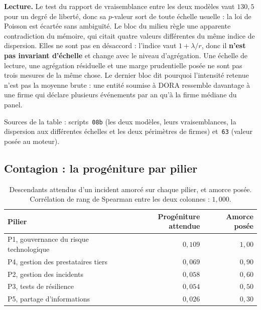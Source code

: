 \documentclass[12pt,a4paper]{article}
\theoremstyle{definition}
\begin{document}
\textbf{Lecture.} Le test du rapport de vraisemblance entre les deux modèles vaut
$130{,}5$ pour un degré de liberté, donc sa $p$-valeur sort de toute échelle
usuelle : la loi de Poisson est écartée sans ambiguïté. Le bloc du milieu règle une
apparente contradiction du mémoire, qui citait quatre valeurs différentes du même
indice de dispersion. Elles ne sont pas en désaccord : l'indice vaut
$1 + \lambda/r$, donc il \textbf{n'est pas invariant d'échelle} et change avec le
niveau d'agrégation. Une échelle de lecture, une agrégation résiduelle et une marge
prudentielle posée ne sont pas trois mesures de la même chose. Le dernier bloc dit
pourquoi l'intensité retenue n'est pas la moyenne brute : une entité soumise à DORA
ressemble davantage à une firme qui déclare plusieurs événements par an qu'à la
firme médiane du panel.

\vspace{4pt}
\noindent Sources de la table : scripts~\texttt{08b} (les deux modèles, leurs
vraisemblances, la dispersion aux différentes échelles et les deux périmètres de
firmes) et~\texttt{63} (valeur posée au moteur).

\subsection*{Contagion : la progéniture par pilier}

\begin{table}[htbp]
\centering\small
\renewcommand{\arraystretch}{1.2}
\begin{tabular}{@{}>{\raggedright\arraybackslash}p{6.4cm}rr@{}}
\toprule
\textbf{Pilier} & \textbf{Progéniture attendue} & \textbf{Amorce posée} \\
\midrule
P1, gouvernance du risque technologique & $0{,}109$ & $1{,}00$ \\
P4, gestion des prestataires tiers      & $0{,}069$ & $0{,}90$ \\
P2, gestion des incidents               & $0{,}058$ & $0{,}60$ \\
P3, tests de résilience                 & $0{,}054$ & $0{,}50$ \\
P5, partage d'informations              & $0{,}026$ & $0{,}30$ \\
\bottomrule
\end{tabular}
\caption{Descendants attendus d'un incident amorcé sur chaque pilier, et amorce
posée. Corrélation de rang de Spearman entre les deux colonnes : $1{,}000$.}
\label{tab:contagion-methodes}
\end{table}
\end{document}
